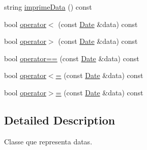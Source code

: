 \begin{DoxyCompactItemize}
\item 
string \hyperlink{class_date_a5b5824086305fb1da07e18b78646f755}{imprime\+Data} () const 
\item 
bool \hyperlink{class_date_a9fbdb9351d89eaf1539640890fa98429}{operator$<$} (const \hyperlink{class_date}{Date} \&data) const 
\item 
bool \hyperlink{class_date_a0a3bc798f75bcd8c301cdc12a14a550b}{operator$>$} (const \hyperlink{class_date}{Date} \&data) const 
\item 
bool \hyperlink{class_date_aa3b4e159a825972b76a8262b2b2899cc}{operator==} (const \hyperlink{class_date}{Date} \&data) const 
\item 
bool \hyperlink{class_date_a0f9b3158f8caf8f081693b0f35a799d8}{operator$<$=} (const \hyperlink{class_date}{Date} \&data) const 
\item 
bool \hyperlink{class_date_a4fce8cac282db85f66f959d90194a41d}{operator$>$=} (const \hyperlink{class_date}{Date} \&data) const 
\end{DoxyCompactItemize}


\subsection{Detailed Description}
Classe que representa datas. 

